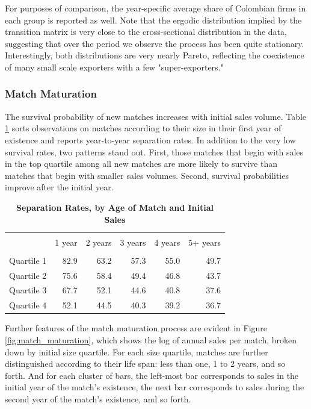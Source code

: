 \documentclass[12pt,titlepage]{article}
\begin{document}
For purposes of comparison, the year-specific average share of Colombian
firms in each group is reported as well. Note that the ergodic distribution
implied by the transition matrix is very close to the cross-sectional
distribution in the data, suggesting that over the period we observe the
process has been quite stationary. Interestingly, both distributions are
very nearly Pareto, reflecting the coexistence of many small scale exporters
with a few "super-exporters."

\subsubsection{Match Maturation}

The survival probability of new matches increases with initial sales volume.
Table \ref{tab:sep_rates} sorts observations on matches according to their
size in their first year of existence and reports year-to-year separation
rates. In addition to the very low survival rates, two patterns stand out.
First, those matches that begin with sales in the top quartile among all new
matches are more likely to survive than matches that begin with smaller
sales volumes. Second, survival probabilities improve after the initial year.

\begin{table}[tbph]
    \centering
    \begin{tabular}{l|rrrrr} \hline \hline \\
                   & 1 year & 2 years & 3 years & 4 years & 5+ years \\ \hline \\
        Quartile 1 & 82.9   & 63.2    & 57.3    & 55.0    & 49.7 \\
        Quartile 2 & 75.6   & 58.4    & 49.4    & 46.8    & 43.7 \\
        Quartile 3 & 67.7   & 52.1    & 44.6    & 40.8    & 37.6 \\
        Quartile 4 & 52.1   & 44.5    & 40.3    & 39.2    & 36.7 \\ \hline
    \end{tabular}
    \caption{\textbf{Separation Rates, by Age of Match and Initial Sales}}
    \label{tab:sep_rates}\centering
\end{table}

Further features of the match maturation process are evident in Figure \ref{fig:match_maturation}, which shows the log of annual sales per match,
broken down by initial size quartile. For each size quartile, matches are
further distinguished according to their life span: less than one, 1 to 2
years, and so forth. And for each cluster of bars, the left-most bar
corresponds to sales in the initial year of the match's existence, the next
bar corresponds to sales during the second year of the match's existence,
and so forth.
\end{document}
